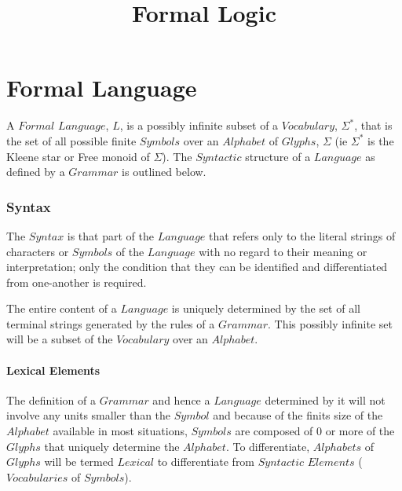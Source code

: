 \documentclass{article}
\begin{document}
\setcounter{tocdepth}{3}


\title{Formal Logic}
\date{}
\maketitle


\tableofcontents


\part{Formal Language}

A $Formal$ $Language$, $L$, is a possibly infinite subset of a
$Vocabulary$, $\Sigma^*$, that is the set of all possible finite
$Symbols$ over an $Alphabet$ of $Glyphs$, $\Sigma$ (ie $\Sigma^*$ is
the Kleene star or Free monoid of $\Sigma$). The $Syntactic$ structure
of a $Language$ as defined by a $Grammar$ is outlined below.

\section{Syntax}

The $Syntax$ is that part of the $Language$ that refers only to the
literal strings of characters or $Symbols$ of the $Language$ with no
regard to their meaning or interpretation; only the condition that
they can be identified and differentiated from one-another is
required.

The entire content of a $Language$ is uniquely determined by the set
of all terminal strings generated by the rules of a $Grammar$. This
possibly infinite set will be a subset of the $Vocabulary$ over an
$Alphabet$.

\subsection{Lexical Elements}

The definition of a $Grammar$ and hence a $Language$ determined by it
will not involve any units smaller than the $Symbol$ and because of
the finits size of the $Alphabet$ available in most situations,
$Symbols$ are composed of 0 or more of the $Glyphs$ that uniquely
determine the $Alphabet$. To differentiate, $Alphabets$ of $Glyphs$
will be termed $Lexical$ to differentiate from $Syntactic$ $Elements$
($Vocabularies$ of $Symbols$).
\end{document}
